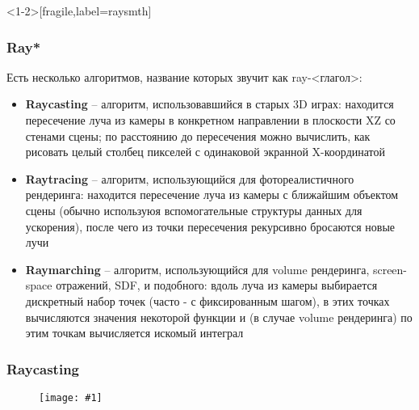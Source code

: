 \documentclass[10pt]{beamer}
\newcommand{\slideimage}[1]{
  \begin{figure}
    \begin{adjustbox}{width=\textwidth, totalheight=\textheight-2\baselineskip-2\baselineskip,keepaspectratio}
      \texttt{[image: \#1]}
    \end{adjustbox}
  \end{figure}
}
\begin{document}
\begin{frame}<1-2>[fragile,label=raysmth]
\fontsize{10pt}{10pt}
\frametitle{Ray*}
Есть несколько алгоритмов, название которых звучит как ray-<глагол>:
\pause
\begin{itemize}
\item \textbf{Raycasting} -- алгоритм, использовавшийся в старых 3D играх: находится пересечение луча из камеры в конкретном направлении в плоскости XZ со стенами сцены; по расстоянию до пересечения можно вычислить, как рисовать целый столбец пикселей с одинаковой экранной X-координатой
\pause
\item \textbf{Raytracing} -- алгоритм, использующийся для фотореалистичного рендеринга: находится пересечение луча из камеры с ближайшим объектом сцены (обычно используюя вспомогательные структуры данных для ускорения), после чего из точки пересечения рекурсивно бросаются новые лучи
\pause
\item \textbf{Raymarching} -- алгоритм, использующийся для volume рендеринга, screen-space отражений, SDF, и подобного: вдоль луча из камеры выбирается дискретный набор точек (часто - с фиксированным шагом), в этих точках вычисляются значения некоторой функции и (в случае volume рендеринга) по этим точкам вычисляется искомый интеграл
\end{itemize}
\end{frame}

\begin{frame}[fragile]
\frametitle{Raycasting}
\slideimage{raycasting.png}
\end{frame}

\end{document}

